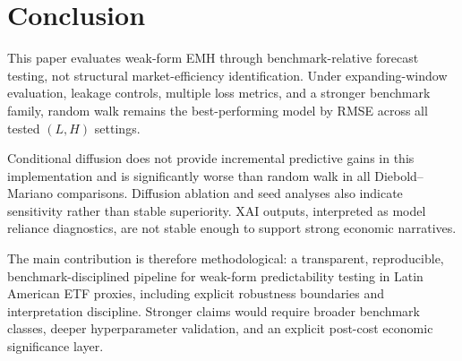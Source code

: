 \section{Conclusion}

This paper evaluates weak-form EMH through benchmark-relative forecast testing, not structural market-efficiency identification. Under expanding-window evaluation, leakage controls, multiple loss metrics, and a stronger benchmark family, random walk remains the best-performing model by RMSE across all tested \((L,H)\) settings.

Conditional diffusion does not provide incremental predictive gains in this implementation and is significantly worse than random walk in all Diebold--Mariano comparisons. Diffusion ablation and seed analyses also indicate sensitivity rather than stable superiority. XAI outputs, interpreted as model reliance diagnostics, are not stable enough to support strong economic narratives.

The main contribution is therefore methodological: a transparent, reproducible, benchmark-disciplined pipeline for weak-form predictability testing in Latin American ETF proxies, including explicit robustness boundaries and interpretation discipline. Stronger claims would require broader benchmark classes, deeper hyperparameter validation, and an explicit post-cost economic significance layer.
